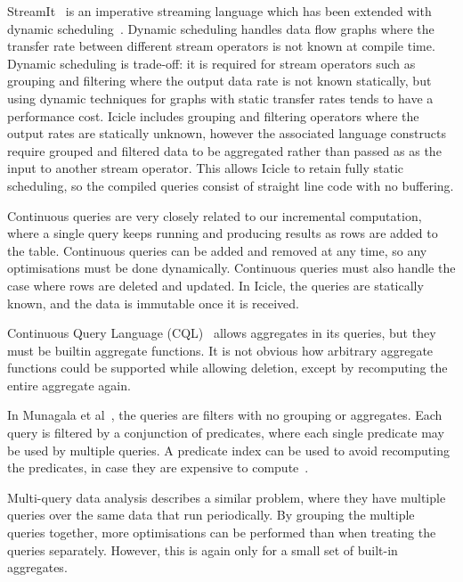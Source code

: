 StreamIt~\cite{thies2002streamit} is an imperative streaming language which has been extended with dynamic scheduling~\cite{soule2013dynamic}. Dynamic scheduling handles data flow graphs where the transfer rate between different stream operators is not known at compile time. Dynamic scheduling is trade-off: it is required for stream operators such as grouping and filtering where the output data rate is not known statically, but using dynamic techniques for graphs with static transfer rates tends to have a performance cost. Icicle includes grouping and filtering operators where the output rates are statically unknown, however the associated language constructs require grouped and filtered data to be aggregated rather than passed as as the input to another stream operator. This allows Icicle to retain fully static scheduling, so the compiled queries consist of straight line code with no buffering.

Continuous queries are very closely related to our incremental computation, where a single query keeps running and producing results as rows are added to the table.
Continuous queries can be added and removed at any time, so any optimisations must be done dynamically.
Continuous queries must also handle the case where rows are deleted and updated.
In Icicle, the queries are statically known, and the data is immutable once it is received.

Continuous Query Language (CQL)~\cite{arasu2002abstract,stream2003stream} allows aggregates in its queries, but they must be builtin aggregate functions.
It is not obvious how arbitrary aggregate functions could be supported while allowing deletion, except by recomputing the entire aggregate again.

In Munagala et al~\cite{munagala2007optimization}, the queries are filters with no grouping or aggregates.
Each query is filtered by a conjunction of predicates, where each single predicate may be used by multiple queries.
A predicate index can be used to avoid recomputing the predicates, in case they are expensive to compute~\cite{madden2002continuously}.


Multi-query data analysis\cite{andrade2003efficient} describes a similar problem, where they have multiple queries over the same data that run periodically.
By grouping the multiple queries together, more optimisations can be performed than when treating the queries separately.
However, this is again only for a small set of built-in aggregates.





